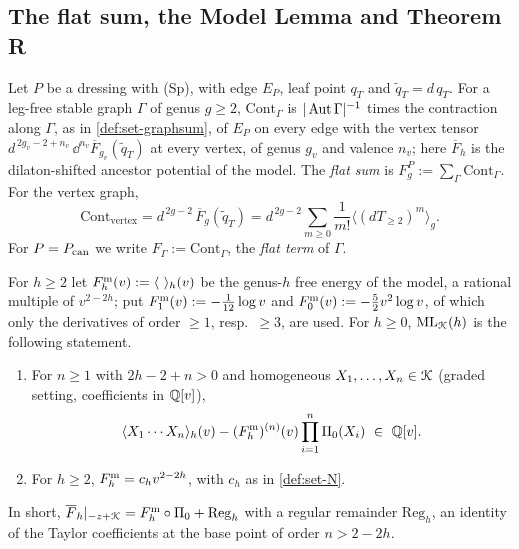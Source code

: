 
\subsection{The flat sum, the Model Lemma and Theorem R}
\label{sec:red}

\begin{defn}
\label{def:red-flatsum}
Let $P$ be a dressing with (Sp), with edge $E_P$, leaf point $q_T$ and $\tilde q_T=d\,q_T$. For a leg-free stable graph $\Gamma$ of genus $g\geq2$, $\mathrm{Cont}_\Gamma$ is $|\operatorname{Aut}\Gamma|^{-1}$ times the contraction along $\Gamma$, as in \cref{def:set-graphsum}, of $E_P$ on every edge with the vertex tensor $d^{\,2g_v-2+n_v}\,\dd^{n_v}\overline F_{g_v}(\tilde q_T)$ at every vertex, of genus $g_v$ and valence $n_v$; here $\overline F_h$ is the dilaton-shifted ancestor potential of the model. The \emph{flat sum} is $F^P_g:=\sum_\Gamma\mathrm{Cont}_\Gamma$. For the vertex graph,
\[
\mathrm{Cont}_{\mathrm{vertex}}=d^{\,2g-2}\,\overline F_g(\tilde q_T)=d^{\,2g-2}\sum_{m\geq0}\frac1{m!}\langle(dT_{\geq2})^m\rangle_g .
\]
For $P=P_{\mathrm{can}}$ we write $F_\Gamma:=\mathrm{Cont}_\Gamma$, the \emph{flat term} of $\Gamma$.
\end{defn}



\begin{defn}
\label{def:red-ML}
For $h\geq2$ let $F^{\mathrm{m}}_h(v):=\langle\ \rangle_h(v)$ be the genus-$h$ free energy of the model, a rational multiple of $v^{2-2h}$; put $F^{\mathrm{m}}_1(v):=-\frac1{12}\log v$ and $F^{\mathrm{m}}_0(v):=-\frac52v^2\log v$, of which only the derivatives of order $\geq1$, resp.\ $\geq3$, are used. For $h\geq0$, $\mathrm{ML}_{\mathcal{K}}(h)$ is the following statement.
\begin{enumerate}
\item For $n\geq1$ with $2h-2+n>0$ and homogeneous $X_1,\dots,X_n\in\mathcal{K}$ (graded setting, coefficients in $\mathbb{Q}[v]$),
\[
\langle X_1\cdots X_n\rangle_h(v)-(F^{\mathrm{m}}_h)^{(n)}(v)\prod_{i=1}^n\Pi_0(X_i)\ \in\ \mathbb{Q}[v] .
\]
\item For $h\geq2$, $F^{\mathrm{m}}_h=c_hv^{2-2h}$, with $c_h$ as in \cref{def:set-N}.
\end{enumerate}
In short, $\overline F_h|_{-z+\mathcal{K}}=F^{\mathrm{m}}_h\circ\Pi_0+\mathrm{Reg}_h$ with a regular remainder $\mathrm{Reg}_h$, an identity of the Taylor coefficients at the base point of order $n>2-2h$.
\end{defn}



